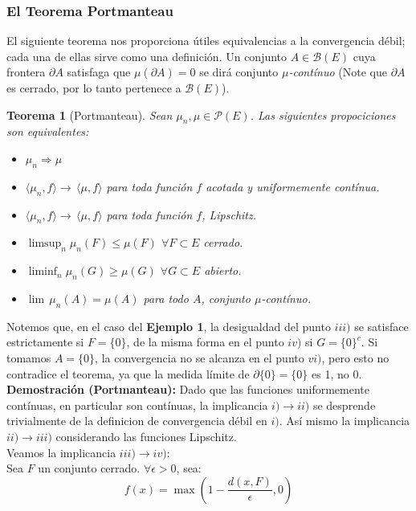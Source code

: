 \documentclass[a4paper]{article}
\newtheorem{teorema}{Teorema}
\numberwithin{equation}{subsection}
\begin{document}
\subsubsection{El Teorema Portmanteau}
El siguiente teorema nos proporciona útiles equivalencias a la convergencia débil; cada una de ellas sirve como una definición. Un conjunto $A \in \mathcal{B}(E)$ cuya frontera $\partial A$ satisfaga que $\mu(\partial A) = 0$ se dirá conjunto \textit{$\mu$-contínuo} (Note que $\partial A$ es cerrado, por lo tanto pertenece a $\mathcal{B}(E)$).
\begin{teorema}[Portmanteau] Sean $\mu_n,\mu \in \mathcal{P}(E)$. Las siguientes propociciones son equivalentes:
\begin{itemize}
    \item[i)] $\mu_n \Rightarrow \mu$
    \item[ii)] $\langle \mu_n,f\rangle \rightarrow\, \langle \mu, f\rangle$ para toda función $f$ acotada y uniformemente contínua.
    \item[iii)] $\langle \mu_n , f \rangle \rightarrow\, \langle \mu, f\rangle$ para toda función $f$, Lipschitz.
    \item[iv)] $\limsup_n \mu_n(F) \leq \mu(F)$   $\forall F \subset E$ cerrado.
    \item[v)] $\liminf_n \mu_n(G) \geq \mu(G)$     $\forall G\subset E$ abierto.
    \item[vi)] $\lim\, \mu_n(A) = \mu(A)$ para todo $A$, conjunto \textit{$\mu$-contínuo}. 
\end{itemize}
\end{teorema}
Notemos que, en el caso del \textbf{Ejemplo 1}, la desigualdad del punto $iii)$ se satisface estrictamente si $F=\{0\}$, de la misma forma en el punto $iv)$ si $G=\{0\}^{c}$. Si tomamos $A=\{0\}$, la convergencia no se alcanza en el punto $vi)$, pero esto no contradice el teorema, ya que la medida límite de $\partial \{0\} = \{0\}$ es 1, no 0. 
\\ \newline
\textbf{Demostración (Portmanteau):} Dado que las funciones uniformemente contínuas, en particular son contínuas, la implicancia $i)\rightarrow ii)$ se desprende trivialmente de la definicion de convergencia débil en $i)$. Así mismo la implicancia $ii) \rightarrow iii)$ considerando las funciones Lipschitz.\\
Veamos la implicancia $iii) \rightarrow iv)$: \\ \newline
Sea $F$ un conjunto cerrado. $\forall \epsilon > 0$, sea:
\begin{equation}
   f(x) = \max\left(1-\frac{d(x,F)}{\epsilon}, 0\right)
   \label{eq:dem1}
\end{equation}
\end{document}
